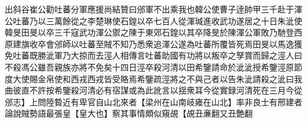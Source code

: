 出斜谷崔公勸吐蕃分軍應援尚結贊曰邠軍不出乘我也韓公使曹子逹帥甲三千赴于渾公吐蕃乃以三萬餘從之李楚琳使石鍠以卒七百人從渾瑊進收武功遂居之十日朱泚使韓旻田旻以卒三千寇武功渾公禦之陳于東郊石鍠以其卒降旻於陳渾公軍敗乃馳登西原建旗收卒會邠師以吐蕃至賊不知乃悉衆追渾公遂為吐蕃所覆皆死焉田旻以馬逸獲免吐蕃既勝泚軍乃大掠而去涇人相傳言吐蕃助國有功將以叛卒之孥賞而歸之涇人曰不殺馮公雖吾親族亦將不免矣十四日涇卒殺河清以田希鑒請命於泚泚授希鑒涇原節度大使賜金帛使和西戎西戎皆受賂焉希鑒疏涇將之不與己者以告朱泚請殺之泚曰我曲彼直不許按希鑒殺河清必有宿謀或為此訛言以揺衆耳今從實録河清死在三月今從邠志】上問陸䞇近有卑官自山北來者【梁州在山南岐雍在山北】率非良士有邢建者論說賊勢語最張皇【皇大也】察其事情頗似窺覘【覘丑亷翻又丑艶翻